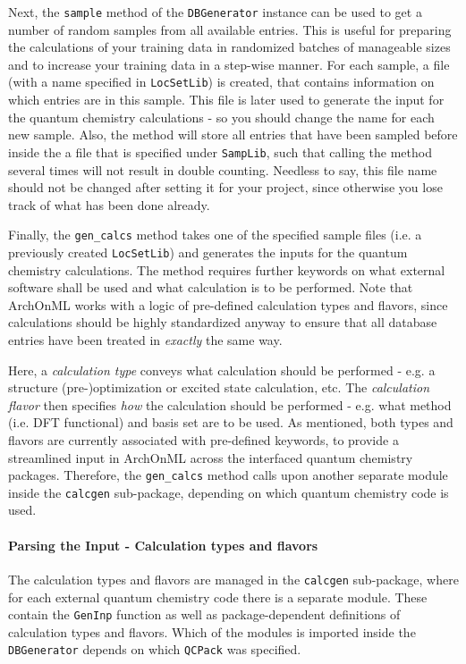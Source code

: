 \documentclass[12pt]{achemso}
\begin{document}
\noindent Next, the \texttt{sample} method of the \texttt{DBGenerator} instance can be used to get a number of random samples from all available entries. This is useful for preparing the calculations of your training data in randomized batches of manageable sizes and to increase your training data in a step-wise manner. For each sample, a file (with a name specified in \texttt{LocSetLib}) is created, that contains information on which entries are in this sample. This file is later used to generate the input for the quantum chemistry calculations - so you should change the name for each new sample. Also, the method will store all entries that have been sampled before inside the a file that is specified under \texttt{SampLib}, such that calling the method several times will not result in double counting. Needless to say, this file name should not be changed after setting it for your project, since otherwise you lose track of what has been done already.

\noindent Finally, the \texttt{gen\_calcs} method takes one of the specified sample files (i.e. a previously created \texttt{LocSetLib}) and generates the inputs for the quantum chemistry calculations. The method requires further keywords on what external software shall be used and what calculation is to be performed. Note that ArchOnML works with a logic of pre-defined calculation types and flavors, since calculations should be highly standardized anyway to ensure that all database entries have been treated in \textit{exactly} the same way.

\noindent Here, a \textit{calculation type} conveys what calculation should be performed - e.g. a structure \linebreak (pre-)optimization or excited state calculation, etc. The \textit{calculation flavor} then specifies \textit{how} the calculation should be performed - e.g. what method (i.e. DFT functional) and basis set are to be used. As mentioned, both types and flavors are currently associated with pre-defined keywords, to provide a streamlined input in ArchOnML across the interfaced quantum chemistry packages. Therefore, the \texttt{gen\_calcs} method calls upon another separate module inside the \texttt{calcgen} sub-package, depending on which quantum chemistry code is used.

\paragraph{Parsing the Input - Calculation types and flavors} The calculation types and flavors are managed in the \texttt{calcgen} sub-package, where for each external quantum chemistry code there is a separate module. These contain the \texttt{GenInp} function as well as package-dependent definitions of calculation types and flavors. Which of the modules is imported inside the \texttt{DBGenerator} depends on which \texttt{QCPack} was specified.
\end{document}
